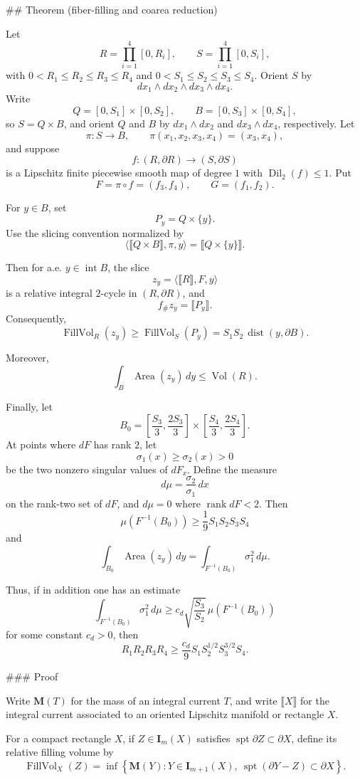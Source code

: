 ## Theorem (fiber-filling and coarea reduction)

Let
\[
R=\prod_{i=1}^4[0,R_i],\qquad S=\prod_{i=1}^4[0,S_i],
\]
with \(0<R_1\le R_2\le R_3\le R_4\) and \(0<S_1\le S_2\le S_3\le S_4\). Orient \(S\) by
\[
dx_1\wedge dx_2\wedge dx_3\wedge dx_4.
\]
Write
\[
Q=[0,S_1]\times[0,S_2],\qquad B=[0,S_3]\times[0,S_4],
\]
so \(S=Q\times B\), and orient \(Q\) and \(B\) by \(dx_1\wedge dx_2\) and \(dx_3\wedge dx_4\), respectively. Let
\[
\pi:S\to B,\qquad \pi(x_1,x_2,x_3,x_4)=(x_3,x_4),
\]
and suppose
\[
f:(R,\partial R)\to(S,\partial S)
\]
is a Lipschitz finite piecewise smooth map of degree \(1\) with \(\operatorname{Dil}_2(f)\le 1\). Put
\[
F=\pi\circ f=(f_3,f_4),\qquad G=(f_1,f_2).
\]

For \(y\in B\), set
\[
P_y=Q\times\{y\}.
\]
Use the slicing convention normalized by
\[
\langle \llbracket Q\times B\rrbracket,\pi,y\rangle
=
\llbracket Q\times\{y\}\rrbracket .
\]

Then for a.e. \(y\in \operatorname{int}B\), the slice
\[
z_y=\langle \llbracket R\rrbracket,F,y\rangle
\]
is a relative integral \(2\)-cycle in \((R,\partial R)\), and
\[
f_\# z_y=\llbracket P_y\rrbracket .
\]
Consequently,
\[
\operatorname{FillVol}_R(z_y)\ge \operatorname{FillVol}_S(P_y)
=S_1S_2\,\operatorname{dist}(y,\partial B).
\]

Moreover,
\[
\int_B \operatorname{Area}(z_y)\,dy\le \operatorname{Vol}(R).
\]

Finally, let
\[
B_0=\left[\frac{S_3}{3},\frac{2S_3}{3}\right]\times
\left[\frac{S_4}{3},\frac{2S_4}{3}\right].
\]
At points where \(dF\) has rank \(2\), let
\[
\sigma_1(x)\ge \sigma_2(x)>0
\]
be the two nonzero singular values of \(dF_x\). Define the measure
\[
d\mu=\frac{\sigma_2}{\sigma_1}\,dx
\]
on the rank-two set of \(dF\), and \(d\mu=0\) where \(\operatorname{rank}dF<2\). Then
\[
\mu(F^{-1}(B_0))\ge \frac19 S_1S_2S_3S_4
\]
and
\[
\int_{B_0}\operatorname{Area}(z_y)\,dy
=
\int_{F^{-1}(B_0)}\sigma_1^2\,d\mu.
\]

Thus, if in addition one has an estimate
\[
\int_{F^{-1}(B_0)}\sigma_1^2\,d\mu
\ge
c_d\sqrt{\frac{S_3}{S_2}}\,
\mu(F^{-1}(B_0))
\]
for some constant \(c_d>0\), then
\[
R_1R_2R_3R_4
\ge
\frac{c_d}{9}S_1S_2^{1/2}S_3^{3/2}S_4.
\]

### Proof

Write \(\mathbf M(T)\) for the mass of an integral current \(T\), and write \(\llbracket X\rrbracket\) for the integral current associated to an oriented Lipschitz manifold or rectangle \(X\).

For a compact rectangle \(X\), if \(Z\in \mathbf I_m(X)\) satisfies \(\operatorname{spt}\partial Z\subset \partial X\), define its relative filling volume by
\[
\operatorname{FillVol}_X(Z)
=
\inf\left\{
\mathbf M(Y):
Y\in \mathbf I_{m+1}(X),\ 
\operatorname{spt}(\partial Y-Z)\subset \partial X
\right\}.
\]

